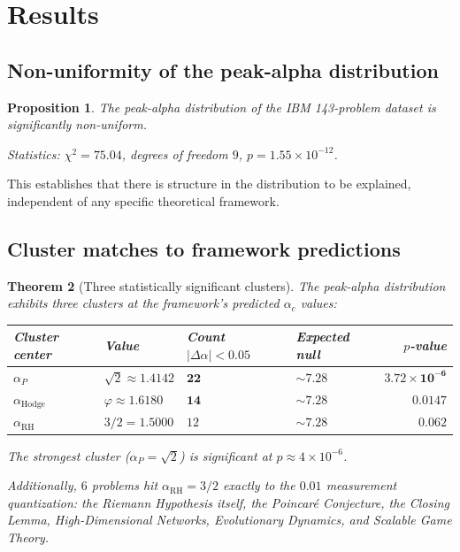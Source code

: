 \documentclass[11pt,a4paper]{article}
\newtheorem{theorem}{Theorem}[section]
\newtheorem{proposition}[theorem]{Proposition}
\theoremstyle{definition}
\begin{document}
\section{Results}

\subsection{Non-uniformity of the peak-alpha distribution}

\begin{proposition}\label{prop:non-uniform}
The peak-alpha distribution of the IBM 143-problem dataset is
significantly non-uniform.

Statistics: $\chi^2 = 75.04$, degrees of freedom $9$,
$p = 1.55 \times 10^{-12}$.
\end{proposition}

This establishes that there is structure in the distribution to be
explained, independent of any specific theoretical framework.

\subsection{Cluster matches to framework predictions}

\begin{theorem}[Three statistically significant clusters]\label{thm:three-clusters}
The peak-alpha distribution exhibits three clusters at the framework's
predicted $\alpha_c$ values:
\begin{center}
\begin{tabular}{llllr}
\toprule
Cluster center & Value & Count $|\Delta\alpha| < 0.05$ & Expected null & $p$-value \\
\midrule
$\alpha_P$ & $\sqrt{2} \approx 1.4142$ & $\mathbf{22}$ & $\sim 7.28$ & $\mathbf{3.72 \times 10^{-6}}$ \\
$\alpha_{\mathrm{Hodge}}$ & $\varphi \approx 1.6180$ & $\mathbf{14}$ & $\sim 7.28$ & $\mathbf{0.0147}$ \\
$\alpha_{\mathrm{RH}}$ & $3/2 = 1.5000$ & $12$ & $\sim 7.28$ & $0.062$ \\
\bottomrule
\end{tabular}
\end{center}
The strongest cluster ($\alpha_P = \sqrt{2}$) is significant at
$p \approx 4 \times 10^{-6}$.

Additionally, $6$ problems hit $\alpha_{\mathrm{RH}} = 3/2$ exactly to
the $0.01$ measurement quantization: the Riemann Hypothesis itself,
the Poincar\'e Conjecture, the Closing Lemma, High-Dimensional
Networks, Evolutionary Dynamics, and Scalable Game Theory.
\end{theorem}
\end{document}
